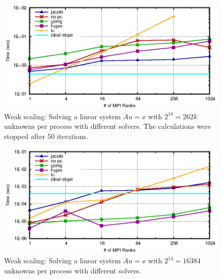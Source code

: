\begin{figure}[tb]
	\centering
	\includegraphics[width=0.99\textwidth]{ex2_weak_time}
	\caption{Weak scaling: Solving a linear system $Au = x$ with $2^{18} = 262k$ unknowns per process with different solvers. The calculations were stopped after 50 iterations.} 
	\label{fig:ex2_weak_time}
\end{figure}


\begin{figure}[tb]
	\centering
	\includegraphics[width=0.99\textwidth]{ex2_weak_nomaxit}
	\caption{Weak scaling: Solving a linear system $Au = x$ with $2^{14} = 16384$ unknowns per process with different solvers. } 
	\label{fig:ex2_weak_nomaxit}
\end{figure}
